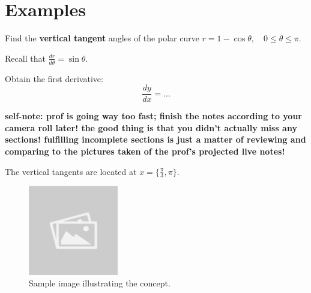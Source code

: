 \documentclass{article}
\begin{document}
\section*{Examples}
\begin{examplebox}
Find the \textbf{vertical tangent} angles of the polar curve \( r = 1 - \cos\theta, \quad 0 \leq \theta \leq \pi \).
\begin{solutionbox}
Recall that \( \frac{dr}{d\theta} = \sin\theta \).

Obtain the first derivative:
\[
    \frac{dy}{dx} = ...
\]

\textbf{self-note: prof is going way too fast; finish the notes according to your camera roll later! the good thing is that you didn't actually miss any sections! fulfilling incomplete sections is just a matter of reviewing and comparing to the pictures taken of the prof's projected live notes!}

\begin{answerbox}
The vertical tangents are located at \( x = \{ \frac{\pi}{3}, \pi \} \).
\end{answerbox}
\end{solutionbox}

\begin{figure}[H]
    \centering
    \includegraphics[width=0.35\textwidth]{sample_image.jpg}
    \caption{Sample image illustrating the concept.}
    \label{fig:sample_image}
\end{figure}

\end{examplebox}
\end{document}
